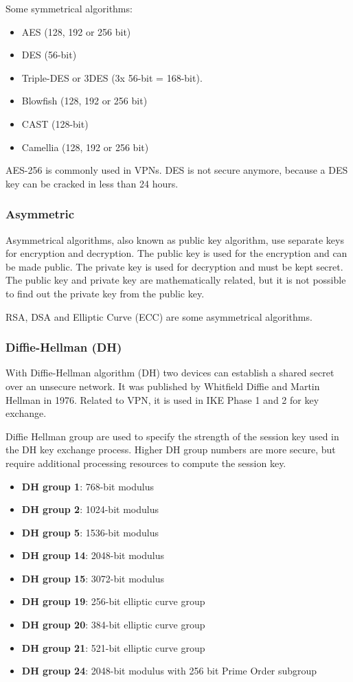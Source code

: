 \documentclass[a4paper]{report}
\begin{document}
Some symmetrical algorithms:
\begin{itemize}
	\item AES (128, 192 or 256 bit)
	\item DES (56-bit)
	\item Triple-DES or 3DES (3x 56-bit = 168-bit).
	\item Blowfish (128, 192 or 256 bit)
	\item CAST (128-bit)
	\item Camellia (128, 192 or 256 bit)
\end{itemize}
AES-256 is commonly used in VPNs. DES is not secure anymore, because a DES key can be cracked in less than 24 hours. \parencite{Bollapragada2005}

\subsubsection{Asymmetric}
\label{sssec:asymmetric}
Asymmetrical algorithms, also known as public key algorithm, use separate keys for encryption and decryption. The public key is used for the encryption and can be made public. The private key is used for decryption and must be kept secret. The public key and private key are mathematically related, but it is not possible to find out the private key from the public key. 

RSA, DSA and Elliptic Curve (ECC) are some asymmetrical algorithms. \parencite{Bollapragada2005}

\subsubsection{Diffie-Hellman (DH)}
\label{sssec:diffie-hellman}
With Diffie-Hellman algorithm (DH) two devices can establish a shared secret over an unsecure network. It was published by Whitfield Diffie and Martin Hellman in 1976. Related to VPN, it is used in IKE Phase 1 and 2 for key exchange. 

Diffie Hellman group are used to specify the strength of the session key used in the DH key exchange process. Higher DH group numbers are more secure, but require additional processing resources to compute the session key. \parencite{JajishThomas}
\begin{itemize}
	\item \textbf{DH group 1}: 768-bit modulus
	\item \textbf{DH group 2}: 1024-bit modulus
	\item \textbf{DH group 5}: 1536-bit modulus
	\item \textbf{DH group 14}: 2048-bit modulus
	\item \textbf{DH group 15}: 3072-bit modulus
	\item \textbf{DH group 19}: 256-bit elliptic curve group
	\item \textbf{DH group 20}: 384-bit elliptic curve group
	\item \textbf{DH group 21}: 521-bit elliptic curve group
	\item \textbf{DH group 24}: 2048-bit modulus with 256 bit Prime Order subgroup
\end{itemize}
\end{document}
